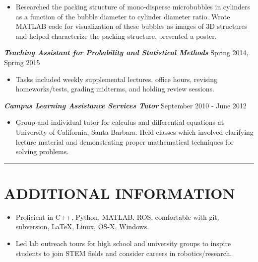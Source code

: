 \documentclass{res}
\begin{document}
\begin{resume}
\begin{itemize}
\item Researched the packing structure of mono-disperse microbubbles in cylinders as a function of the bubble diameter to cylinder diameter ratio. Wrote MATLAB code for visualization of these bubbles as images of 3D structures and helped characterize the packing structure, presented a poster.
\end{itemize}
\vspace*{-1ex}
{\sl \bf Teaching Assistant for Probability and Statistical Methods} \hfill Spring 2014, Spring 2015
\vspace*{.5ex}
\begin{itemize}
\item Tasks included weekly supplemental lectures, office hours, revising homeworks/tests, grading midterms, and holding review sessions.
\end{itemize}
\vspace*{-1ex}
{\sl \bf Campus Learning Assistance Services Tutor} \hfill September 2010 - June 2012
\vspace*{.5ex}
\begin{itemize}
\item Group and individual tutor for calculus and differential equations at University of California, Santa Barbara. Held classes which involved clarifying lecture material and demonstrating proper mathematical techniques for solving problems.
\end{itemize}
\vspace*{0ex}
 \vspace*{-3ex}
\hspace{-8.5ex}\rule{16.5cm}{0.4pt}
 \vspace*{-3ex}

\section{ADDITIONAL INFORMATION}
\vspace{3ex}
\begin{itemize}
\item Proficient in C++, Python, MATLAB, ROS, comfortable with git, subversion, LaTeX, Linux, OS-X, Windows.
\item Led lab outreach tours for high school and university groups to inspire students to join STEM fields and consider careers in robotics/research.
\end{itemize}



\end{resume}
\end{document}
